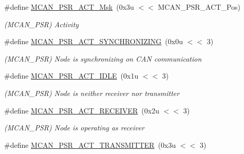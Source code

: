 \begin{DoxyCompactItemize}
\mbox{\label{group__SAMV71__MCAN_ga214a0c0547be506e2b3ce5519d71b378}} 
\#define \mbox{\hyperlink{group__SAMV71__MCAN_ga214a0c0547be506e2b3ce5519d71b378}{M\+C\+A\+N\+\_\+\+P\+S\+R\+\_\+\+A\+C\+T\+\_\+\+Msk}}~(0x3u $<$$<$ M\+C\+A\+N\+\_\+\+P\+S\+R\+\_\+\+A\+C\+T\+\_\+\+Pos)
\begin{DoxyCompactList}\small\item\em (M\+C\+A\+N\+\_\+\+P\+SR) Activity \end{DoxyCompactList}\item 
\mbox{\label{group__SAMV71__MCAN_gab9677f9eb22f983a57b1caf75aabd664}} 
\#define \mbox{\hyperlink{group__SAMV71__MCAN_gab9677f9eb22f983a57b1caf75aabd664}{M\+C\+A\+N\+\_\+\+P\+S\+R\+\_\+\+A\+C\+T\+\_\+\+S\+Y\+N\+C\+H\+R\+O\+N\+I\+Z\+I\+NG}}~(0x0u $<$$<$ 3)
\begin{DoxyCompactList}\small\item\em (M\+C\+A\+N\+\_\+\+P\+SR) Node is synchronizing on C\+AN communication \end{DoxyCompactList}\item 
\mbox{\label{group__SAMV71__MCAN_ga1dbde2ab28602d7d74077f3d742cf9d1}} 
\#define \mbox{\hyperlink{group__SAMV71__MCAN_ga1dbde2ab28602d7d74077f3d742cf9d1}{M\+C\+A\+N\+\_\+\+P\+S\+R\+\_\+\+A\+C\+T\+\_\+\+I\+D\+LE}}~(0x1u $<$$<$ 3)
\begin{DoxyCompactList}\small\item\em (M\+C\+A\+N\+\_\+\+P\+SR) Node is neither receiver nor transmitter \end{DoxyCompactList}\item 
\mbox{\label{group__SAMV71__MCAN_ga04164add021af16aed40542f0d908d85}} 
\#define \mbox{\hyperlink{group__SAMV71__MCAN_ga04164add021af16aed40542f0d908d85}{M\+C\+A\+N\+\_\+\+P\+S\+R\+\_\+\+A\+C\+T\+\_\+\+R\+E\+C\+E\+I\+V\+ER}}~(0x2u $<$$<$ 3)
\begin{DoxyCompactList}\small\item\em (M\+C\+A\+N\+\_\+\+P\+SR) Node is operating as receiver \end{DoxyCompactList}\item 
\mbox{\label{group__SAMV71__MCAN_ga380e7eb0fecbb1dbe5962191e5893ce1}} 
\#define \mbox{\hyperlink{group__SAMV71__MCAN_ga380e7eb0fecbb1dbe5962191e5893ce1}{M\+C\+A\+N\+\_\+\+P\+S\+R\+\_\+\+A\+C\+T\+\_\+\+T\+R\+A\+N\+S\+M\+I\+T\+T\+ER}}~(0x3u $<$$<$ 3)
$$
\end{DoxyCompactItemize}
